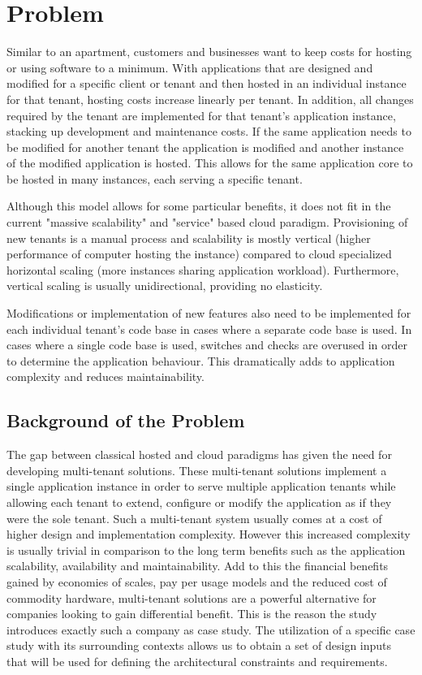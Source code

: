  \section{Problem}
 
Similar to an apartment, customers and businesses want to keep costs for hosting or using software to a minimum. With applications that are designed and modified for a specific client or tenant and then hosted in an individual instance for that tenant, hosting costs increase linearly per tenant. In addition, all changes required by the tenant are implemented for that tenant's application instance, stacking up development and maintenance costs. If the same application needs to be modified for another tenant the application is modified and another instance of the modified application is hosted. This allows for the same application core to be hosted in many instances, each serving a specific tenant. 

Although this model allows for some particular benefits, it does not fit in the current "massive scalability" and "service" based cloud paradigm. Provisioning of new tenants is a manual process and scalability is mostly vertical (higher performance of computer hosting the instance) compared to cloud specialized horizontal scaling (more instances sharing application workload). Furthermore, vertical scaling is usually unidirectional, providing no elasticity. 

Modifications or implementation of new features also need to be implemented for each individual tenant's code base in cases where a separate code base is used. In cases where a single code base is used, switches and checks are overused in order to determine the application behaviour. This dramatically adds to application complexity and reduces maintainability.

\subsection{Background of the Problem}
The gap between classical hosted and cloud paradigms has given the need for developing multi-tenant solutions. These multi-tenant solutions implement a single application instance in order to serve multiple application tenants while allowing each tenant to extend, configure or modify the application as if they were the sole tenant. Such a multi-tenant system usually comes at a cost of higher design and implementation complexity. However this increased complexity is usually trivial in comparison to the long term benefits such as the application scalability, availability and maintainability. Add to this the financial benefits gained by economies of scales, pay per usage models and the reduced cost of commodity hardware, multi-tenant solutions are a powerful alternative for companies looking to gain differential benefit. This is the reason the study introduces exactly such a company as case study. The utilization of a specific case study with its surrounding contexts allows us to obtain a set of design inputs that will be used for defining the architectural constraints and requirements. 

